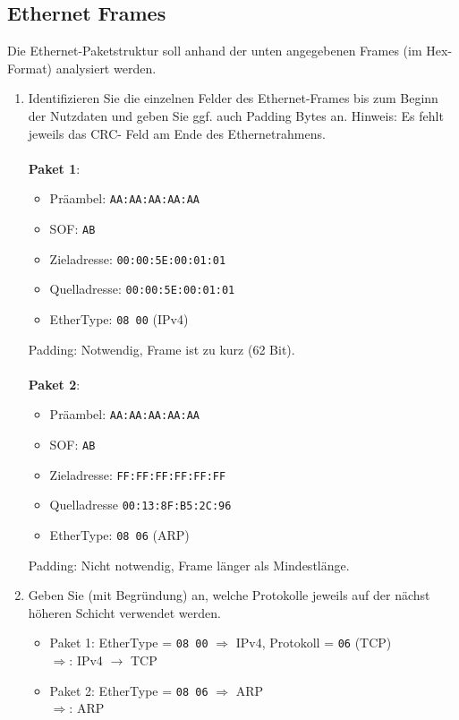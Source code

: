 \documentclass[a4paper]{article}
\begin{document}
\subsection{Ethernet Frames}
Die Ethernet-Paketstruktur soll anhand der unten angegebenen Frames (im Hex-Format) analysiert werden.
\begin{enumerate}[label=\alph*)]
\item Identifizieren Sie die einzelnen Felder des Ethernet-Frames bis zum Beginn der Nutzdaten und geben Sie ggf. auch Padding Bytes an. Hinweis: Es fehlt jeweils das CRC- Feld am Ende des Ethernetrahmens.\\\\
\textbf{Paket 1}:
\begin{itemize}
  \item Präambel: \texttt{AA:AA:AA:AA:AA}
  \item SOF: \texttt{AB}
  \item Zieladresse: \texttt{00:00:5E:00:01:01}
  \item Quelladresse: \texttt{00:00:5E:00:01:01}
  \item EtherType: \texttt{08 00} (IPv4)
\end{itemize}
Padding: Notwendig, Frame ist zu kurz (62 Bit).\\\\
\textbf{Paket 2}:
\begin{itemize}
  \item Präambel: \texttt{AA:AA:AA:AA:AA}
  \item SOF: \texttt{AB}
  \item Zieladresse: \texttt{FF:FF:FF:FF:FF:FF}
  \item Quelladresse \texttt{00:13:8F:B5:2C:96}
  \item EtherType: \texttt{08 06} (ARP)
\end{itemize}
Padding: Nicht notwendig, Frame länger als Mindestlänge.

\item Geben Sie (mit Begründung) an, welche Protokolle jeweils auf der nächst höheren Schicht verwendet werden.
\begin{itemize}
  \item Paket 1: EtherType = \texttt{08 00} $\Rightarrow$ IPv4, Protokoll = \texttt{06} (TCP) \\
  $\Rightarrow$: IPv4 $\rightarrow$ TCP
  \item Paket 2: EtherType = \texttt{08 06} $\Rightarrow$ ARP \\
  $\Rightarrow$: ARP
\end{itemize}
\end{enumerate}
\end{document}
